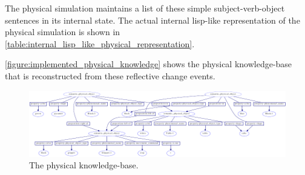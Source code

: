 The physical simulation maintains a list of these simple
subject-verb-object sentences in its internal state.  The actual
internal lisp-like representation of the physical simulation is shown
in \autoref{table:internal_lisp_like_physical_representation}.
\begin{table}
\begin{center}
{}
\end{center}
\caption[Internal representation for physical simulation.]{Internal representation for physical simulation.}
\label{table:internal_lisp_like_physical_representation}
\end{table}
{\mbox{\autoref{figure:implemented_physical_knowledge}}} shows the
physical knowledge-base that is reconstructed from these reflective
change events.
\begin{figure}
\begin{center}
\includegraphics[width=7.5in]{gfx/implemented_physical_knowledge}
\end{center}
\hspace{4cm}\parbox{15cm}{\caption[The physical knowledge-base.]{The
    physical
    knowledge-base.}\label{figure:implemented_physical_knowledge}}
\end{figure}

